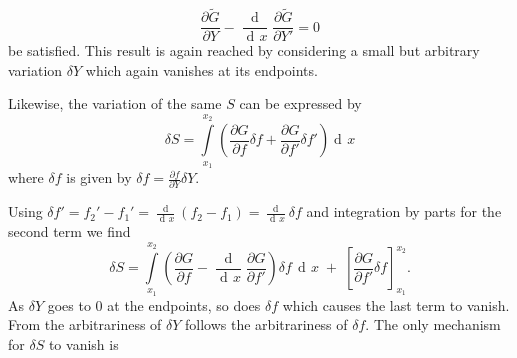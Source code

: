 \documentclass[prb,preprint]{revtex4-1}
\DeclareMathOperator{\dd}{d\!}
\DeclareMathOperator{\ddd}{\mathrm{d}}
\begin{document}
\begin{equation}
\frac{\partial \widetilde{G}}{\partial Y}
- \frac{\ddd}{\dd x}\frac{\partial \widetilde{G}}{\partial Y'} = 0
\end{equation}
be satisfied. This result is again reached by considering a small but arbitrary variation $\delta Y$ which again vanishes at its endpoints.

Likewise, the variation of the same $S$ can be expressed by
\begin{equation}
\delta S = \int\limits_{x_1}^{x_2} \left( \frac{\partial G}{\partial f} \delta f
+ \frac{\partial G}{\partial f'} \delta f' \right) \dd x
\end{equation}
where $\delta f$ is given by $\delta f = \frac{\partial f}{\partial Y} \delta Y$.


Using $\delta f' = f_2' - f_1' = \frac{\ddd}{\dd x}(f_2 - f_1) = \frac{\dd}{\dd x} \delta f$ and integration by parts for the second term we find
\begin{equation}
\delta S = \int\limits_{x_1}^{x_2} \left( \frac{\partial G}{\partial f}
- \frac{\ddd}{\dd x} \frac{\partial G}{\partial f'} \right) \delta f \, \dd x \;
+ \; \left[\frac{\partial G}{\partial f'} \delta f \right]_{x_1}^{x_2}.
\end{equation}
As $\delta Y$ goes to $0$ at the endpoints, so does $\delta f$ which causes the last term to vanish. From the arbitrariness of $\delta Y$ follows the arbitrariness of $\delta f$. The only mechanism for $\delta S$ to vanish is
\end{document}
